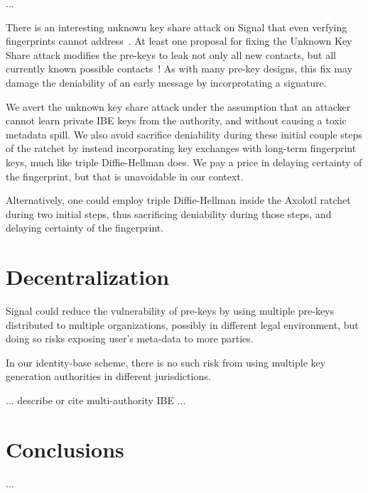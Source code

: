 \documentclass[twoside,letterpaper]{sig-alternate}
\begin{document}
\smallskip


\smallskip

...

There is an interesting unknown key share attack on Signal that
even verfying fingerprints cannot address~\cite[\S4.2]{TextSecure}.
At least one proposal for fixing the Unknown Key Share attack
modifies the pre-keys to leak not only all new contacts, but
all currently known possible contacts~\cite[\S4.3]{TextSecure}! 
As with many pre-key designs, this fix may damage the deniability
 of an early message by incorprotating a signature.

We avert the unknown key share attack under the assumption that
an attacker cannot learn private IBE keys from the authority, and
 without causing a toxic metadata spill.
We also avoid sacrifice deniability during these initial couple steps of
the ratchet by instead incorporating key exchanges with long-term
fingerprint keys, much like triple Diffie-Hellman does.
We pay a price in delaying certainty of the fingerprint, but
 that is unavoidable in our context.


Alternatively, one could employ triple Diffie-Hellman inside the
Axolotl ratchet during two initial steps,
 thus sacrificing deniability during those steps,
 and delaying certainty of the fingerprint. 



\section{Decentralization}

Signal could reduce the vulnerability of pre-keys by using
multiple pre-keys distributed to multiple organizations,
 possibly in different legal environment, but
doing so risks exposing user's meta-data to more parties.

In our identity-base scheme, there is no such risk from using
multiple key generation authorities in different jurisdictions.

... describe or cite multi-authority IBE ...


\section{Conclusions}

...







\end{document}
